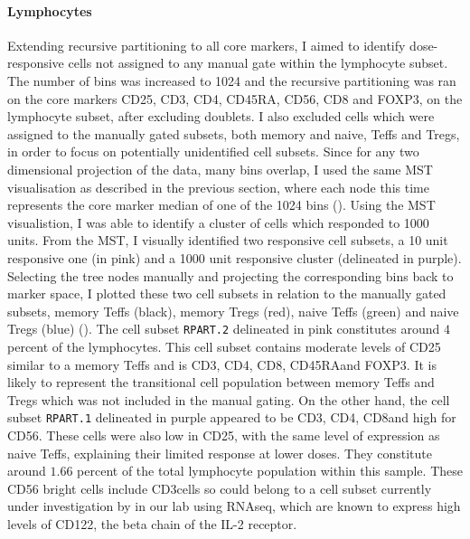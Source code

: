 \clearpage

\paragraph{Lymphocytes} 
Extending recursive partitioning to all core markers, I aimed to identify dose-responsive cells not assigned to any manual gate within the lymphocyte subset.
The number of bins was increased to 1024 and the recursive partitioning was ran on the core markers CD25, CD3, CD4, CD45RA, CD56, CD8 and FOXP3, on the lymphocyte subset, after excluding doublets.
I also excluded cells which were assigned to the manually gated subsets, both memory and naive, Teffs and Tregs, in order to focus on potentially unidentified cell subsets.
Since for any two dimensional projection of the data, many bins overlap, I used the same \gls{MST} visualisation as described in the previous section, where each node this time represents the core marker median of one of the 1024 bins ().
Using the MST visualistion, I was able to identify a cluster of cells which responded to 1000 units.
From the MST, I visually identified two responsive cell subsets, a 10 unit responsive one (in pink) and a 1000 unit responsive cluster (delineated in purple).
Selecting the tree nodes manually and projecting the corresponding bins back to marker space, I plotted these two cell subsets in relation to the
manually gated subsets, memory Teffs (black), memory Tregs (red), naive Teffs (green) and naive Tregs (blue) ().
The cell subset \texttt{RPART.2} delineated in pink constitutes around $4$ percent of the lymphocytes.
This cell subset contains moderate levels of CD25 similar to a memory Teffs and is CD3\positive, CD4\positive, CD8\negative, CD45RA\negative and FOXP3\negative.
It is likely to represent the transitional cell population between memory Teffs and Tregs which was not included in the manual gating.
On the other hand, the cell subset \texttt{RPART.1} delineated in purple appeared to be CD3\negative, CD4\negative, CD8\negative and high for CD56.
These cells were also low in CD25, with the same level of expression as naive Teffs, explaining their limited response at lower doses.
They constitute around $1.66$ percent of the total lymphocyte population within this sample.
These CD56 bright cells include CD3\negative cells so could belong to a cell subset currently under investigation by  in our lab using RNAseq,
which are known to express high levels of CD122, the beta chain of the IL-2 receptor.

